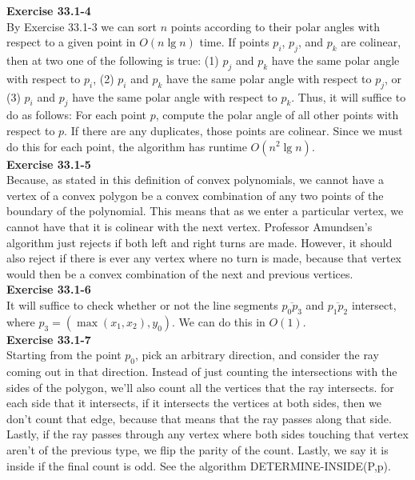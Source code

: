 \documentclass{article}
\begin{document}
\noindent\textbf{Exercise 33.1-4}\\

By Exercise 33.1-3 we can sort $n$ points according to their polar angles with respect to a given point in $O(n\lg n)$ time.  If points $p_i$, $p_j$, and $p_k$ are colinear, then at two one of the following is true: (1) $p_j$ and $p_k$ have the same polar angle with respect to $p_i$, (2) $p_i$ and $p_k$ have the same polar angle with respect to $p_j$, or (3) $p_i$ and $p_j$ have the same polar angle with respect to $p_k$.  Thus, it will suffice to do as follows: For each point $p$, compute the polar angle of all other points with respect to $p$.  If there are any duplicates, those points are colinear.  Since we must do this for each point, the algorithm has runtime $O(n^2\lg n)$. \\

\noindent\textbf{Exercise 33.1-5}\\

Because, as stated in this definition of convex polynomials, we cannot have a vertex of a convex polygon be a convex combination of any two points of the boundary of the polynomial. This means that as we enter a particular vertex, we cannot have that it is colinear with the next vertex. Professor Amundsen's algorithm just rejects if both left and right turns are made. However, it should also reject if there is ever any vertex where no turn is made, because that vertex would then be a convex combination of the next and previous vertices.\\

\noindent\textbf{Exercise 33.1-6}\\

It will suffice to check whether or not the line segments $\overline{p_0 p_3}$ and $\overline{p_1 p_2}$ intersect, where $p_3 = (\max(x_1,x_2), y_0)$.  We can do this in $O(1)$. \\

\noindent\textbf{Exercise 33.1-7}\\

Starting from the point $p_0$, pick an arbitrary direction, and consider the ray coming out in that direction. Instead of just counting the intersections with the sides of the polygon, we'll also count all the vertices that the ray intersects. for each side that it intersects, if it intersects the vertices at both sides, then we don't count that edge, because that means that the ray passes along that side. Lastly, if the ray passes through any vertex where both sides touching that vertex aren't of the previous type, we flip the parity of the count. Lastly, we say it is inside if the final count is odd. See the algorithm DETERMINE-INSIDE(P,p).\\
\end{document}
